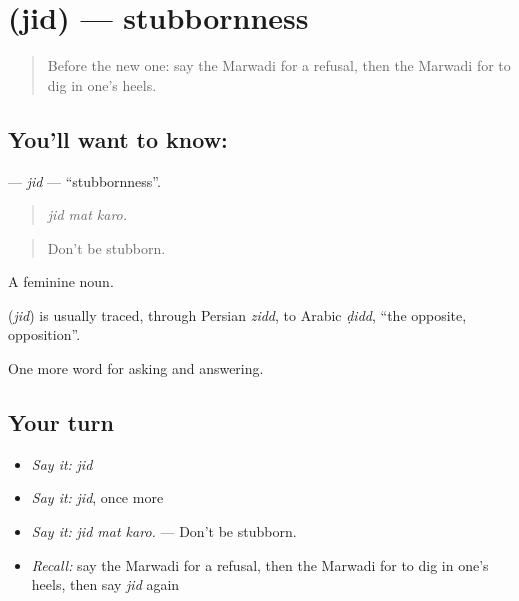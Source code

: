 \section[\texorpdfstring{\mw{जिद} (jid)}{जिद (jid)}]{ (jid) — stubbornness}

\label{lesson:MW-C269-jid}



\begin{quote}
Before the new one: say the Marwadi for a refusal, then the Marwadi for to dig in one's heels.
\end{quote}

\subsection*{You'll want to know: }
\textbf{} — \emph{jid} — \textquotedblleft{}stubbornness\textquotedblright{}.

\begin{quote}
  
\end{quote}

\begin{quote}
\emph{jid mat karo.}
\end{quote}

\begin{quote}
Don't be stubborn.
\end{quote}

A feminine noun.

\begin{cousinweb}
\textbf{} (\emph{jid}) is usually traced, through Persian \emph{zidd}, to Arabic \emph{ḍidd}, \textquotedblleft{}the opposite, opposition\textquotedblright{}.
\end{cousinweb}

\begin{grammarlens}[title={What you've built}]
One more word for asking and answering.
\end{grammarlens}

\subsection*{Your turn}
\begin{itemize}
\raggedright
  \item \emph{Say it:} \emph{jid}
  \item \emph{Say it:} \emph{jid}, once more
  \item \emph{Say it:} \emph{jid mat karo.} — Don't be stubborn.
  \item \emph{Recall:} say the Marwadi for a refusal, then the Marwadi for to dig in one's heels, then say \emph{jid} again
\end{itemize}


